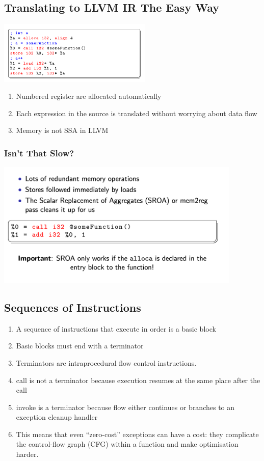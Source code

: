 \documentclass[a4paper]{article}
\theoremstyle{definition}
\begin{document}
  \subsection{Translating to LLVM IR The Easy Way}
  \begin{center}
    \includegraphics[height=3cm]{img/Snipaste_2021-04-05_17-35-19.png}
    \end{center}
    \begin{enumerate}
      \item Numbered register are allocated automatically
      \item  Each expression in the source is translated without worrying
      about data flow
      \item  Memory is not SSA in LLVM
    \end{enumerate}
    \subsubsection{Isn’t That Slow?}
    \begin{center}
      \includegraphics[height=6cm]{img/Snipaste_2021-04-05_17-37-34.png}
      \end{center}
\subsection{Sequences of Instructions}
\begin{enumerate}

  \item A sequence of instructions that execute in order is a basic block
  \item Basic blocks must end with a terminator
  \item Terminators are intraprocedural flow control instructions.
  \item call is not a terminator because execution resumes at the same place after the call
  \item invoke is a terminator because flow either continues or branches to an exception cleanup handler
  \item This means that even “zero-cost” exceptions can have a cost: they complicate the control-flow graph (CFG) within a function and make optimisation harder.
\end{enumerate}
\end{document}
